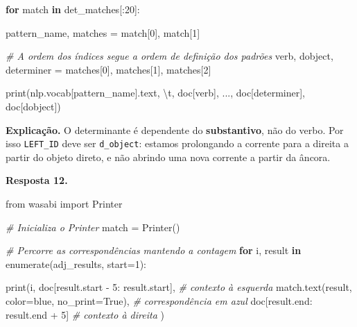 \documentclass[
  brazilian,
]{article}
\newenvironment{Shaded}{}{}
\newcommand{\BuiltInTok}[1]{#1}
\newcommand{\CharTok}[1]{\textcolor[rgb]{0.25,0.44,0.63}{#1}}
\newcommand{\CommentTok}[1]{\textcolor[rgb]{0.38,0.63,0.69}{\textit{#1}}}
\newcommand{\ControlFlowTok}[1]{\textcolor[rgb]{0.00,0.44,0.13}{\textbf{#1}}}
\newcommand{\DecValTok}[1]{\textcolor[rgb]{0.25,0.63,0.44}{#1}}
\newcommand{\ImportTok}[1]{#1}
\newcommand{\KeywordTok}[1]{\textcolor[rgb]{0.00,0.44,0.13}{\textbf{#1}}}
\newcommand{\NormalTok}[1]{#1}
\newcommand{\OperatorTok}[1]{\textcolor[rgb]{0.40,0.40,0.40}{#1}}
\newcommand{\StringTok}[1]{\textcolor[rgb]{0.25,0.44,0.63}{#1}}
\newcommand{\VariableTok}[1]{\textcolor[rgb]{0.10,0.09,0.49}{#1}}
\begin{document}
\begin{Shaded}
\begin{Highlighting}[]
\ControlFlowTok{for}\NormalTok{ match }\KeywordTok{in}\NormalTok{ det\_matches[:}\DecValTok{20}\NormalTok{]:}

\NormalTok{    pattern\_name, matches }\OperatorTok{=}\NormalTok{ match[}\DecValTok{0}\NormalTok{], match[}\DecValTok{1}\NormalTok{]}

    \CommentTok{\# A ordem dos índices segue a ordem de definição dos padrões}
\NormalTok{    verb, dobject, determiner }\OperatorTok{=}\NormalTok{ matches[}\DecValTok{0}\NormalTok{], matches[}\DecValTok{1}\NormalTok{], matches[}\DecValTok{2}\NormalTok{]}

    \BuiltInTok{print}\NormalTok{(nlp.vocab[pattern\_name].text, }\StringTok{\textquotesingle{}}\CharTok{\textbackslash{}t}\StringTok{\textquotesingle{}}\NormalTok{,}
\NormalTok{          doc[verb], }\StringTok{\textquotesingle{}...\textquotesingle{}}\NormalTok{, doc[determiner], doc[dobject])}
\end{Highlighting}
\end{Shaded}

\textbf{Explicação.} O determinante é dependente do
\textbf{substantivo}, não do verbo. Por isso \texttt{LEFT\_ID} deve ser
\texttt{d\_object}: estamos prolongando a corrente para a direita a
partir do objeto direto, e não abrindo uma nova corrente a partir da
âncora.

\textbf{Resposta 12.}

\begin{Shaded}
\begin{Highlighting}[]
\ImportTok{from}\NormalTok{ wasabi }\ImportTok{import}\NormalTok{ Printer}

\CommentTok{\# Inicializa o Printer}
\NormalTok{match }\OperatorTok{=}\NormalTok{ Printer()}

\CommentTok{\# Percorre as correspondências mantendo a contagem}
\ControlFlowTok{for}\NormalTok{ i, result }\KeywordTok{in} \BuiltInTok{enumerate}\NormalTok{(adj\_results, start}\OperatorTok{=}\DecValTok{1}\NormalTok{):}

    \BuiltInTok{print}\NormalTok{(i,}
\NormalTok{          doc[result.start }\OperatorTok{{-}} \DecValTok{5}\NormalTok{: result.start],   }\CommentTok{\# contexto à esquerda}
\NormalTok{          match.text(result, color}\OperatorTok{=}\StringTok{\textquotesingle{}blue\textquotesingle{}}\NormalTok{, no\_print}\OperatorTok{=}\VariableTok{True}\NormalTok{),  }\CommentTok{\# correspondência em azul}
\NormalTok{          doc[result.end: result.end }\OperatorTok{+} \DecValTok{5}\NormalTok{]        }\CommentTok{\# contexto à direita}
\NormalTok{         )}
\end{Highlighting}
\end{Shaded}
\end{document}
